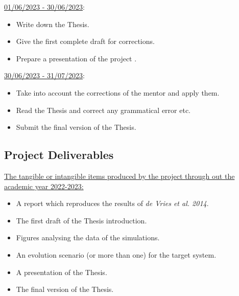 \documentclass{uva-inf-article}
\numberwithin{equation}{section}
\begin{document}
\hspace*{-0.7cm}\underline{01/06/2023 - 30/06/2023}:
\begin{itemize}
    \item Write down the Thesis.
    \item Give the first complete draft for corrections.
    \item Prepare a presentation of the project .
\end{itemize}

\hspace*{-0.7cm}\underline{30/06/2023 - 31/07/2023}:
\begin{itemize}
    \item Take into account the corrections of the mentor and apply them.
    \item Read the Thesis and correct any grammatical error etc.
    \item Submit the final version of the Thesis.
\end{itemize}

\subsection{Project Deliverables}
\underline{The tangible or intangible items produced by the project through out the academic year 2022-2023:}\\
\vspace{0.1cm}
\begin{itemize}
    \item A report which reproduces the results of {\it de Vries et al. 2014}.
    \item The first draft of the Thesis introduction.
    \item Figures analysing the data of the simulations.
    \item An evolution scenario (or more than one) for the target system.
    \item A presentation of the Thesis.
    \item The final version of the Thesis.
\end{itemize}




\end{document}
